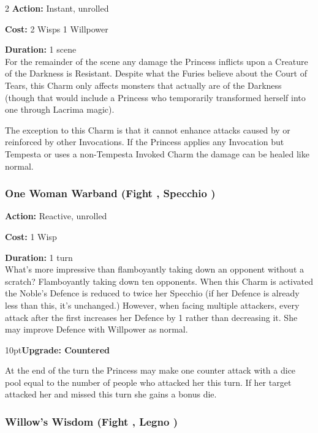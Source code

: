 \begin{multicols}{2}
\noindent \textbf{Action:} Instant, unrolled

\noindent \textbf{Cost:} 2 Wisps 1 Willpower

\noindent \textbf{Duration:} 1 scene\\

For the remainder of the scene any damage the Princess inflicts upon a Creature of the Darkness is Resistant. Despite what the Furies believe about the Court of Tears, this Charm only affects monsters that actually are of the Darkness (though that would include a Princess who temporarily transformed herself into one through Lacrima magic). 

The exception to this Charm is that it cannot enhance attacks caused by or reinforced by other Invocations. If the Princess applies any Invocation but Tempesta or uses a non-Tempesta Invoked Charm the damage can be healed like normal. 

\subsubsection*{One Woman Warband (Fight \textbullet\textbullet, Specchio \textbullet\textbullet\textbullet)}

\noindent \textbf{Action:} Reactive, unrolled

\noindent \textbf{Cost:} 1 Wisp

\noindent \textbf{Duration:} 1 turn\\

\noindent What's more impressive than flamboyantly taking down an opponent without a scratch? Flamboyantly taking down ten opponents. When this Charm is activated the Noble’s Defence is reduced to twice her Specchio (if her Defence is already less than this, it’s unchanged.) However, when facing multiple attackers, every attack after the first increases her Defence by 1 rather than decreasing it. She may improve Defence with Willpower as normal.

\begin{myindentpar}{10pt}\textbf{Upgrade: Countered}

At the end of the turn the Princess may make one counter attack with a dice pool equal to the number of people who attacked her this turn. If her target attacked her and missed this turn she gains a bonus die.\end{myindentpar}

\subsubsection*{Willow’s Wisdom (Fight \textbullet\textbullet, Legno \textbullet\textbullet)}


\end{multicols}
